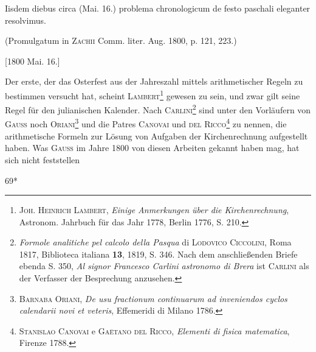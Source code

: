 \indent Iisdem diebus circa (Mai. 16.) problema chronologicum de festo paschali eleganter resolvimus.
\par\indent(Promulgatum in \textsc{Zachii} Comm. liter. Aug. 1800, p. 121, 223.)
\par\noindent\hfill[1800 Mai. 16.]

\medskip\begingroup\small
\renewcommand{\thefootnote}{*)}
\indent Der erste, der das Osterfest aus der Jahreszahl mittels arithmetischer Regeln zu bestimmen versucht hat, scheint \textsc{Lambert}\footnote{\textsc{Joh. Heinrich Lambert}, \textit{Einige Anmerkungen über die Kirchenrechnung}, Astronom. Jahrbuch für das Jahr 1778, Berlin 1776, S. 210.} gewesen zu sein, und zwar gilt seine Regel für den julianischen Kalender. Nach \textsc{Carlini}\renewcommand{\thefootnote}{**)}\footnote{\textit{Formole analitiche pel calcolo della Pasqua} di \textsc{Lodovico Ciccolini}, Roma 1817, Biblioteca italiana \textbf{13}, 1819, S. 346. Nach dem anschließenden Briefe ebenda S. 350, \textit{Al signor Francesco Carlini astronomo di Brera} ist \textsc{Carlini} als der Verfasser der Besprechung anzusehen.} sind unter den Vorläufern von \textsc{Gauss} noch \textsc{Oriani}\renewcommand{\thefootnote}{***)}\footnote{\textsc{Barnaba Oriani}, \textit{De usu fractionum continuarum ad inveniendos cyclos calendarii novi et veteris}, Effemeridi di Milano 1786.} und die Patres \textsc{Canovai} und \textsc{del Ricco}\renewcommand{\thefootnote}{\ensuremath{\dagger})}\footnote{\textsc{Stanislao Canovai} e \textsc{Gaëtano del Ricco}, \textit{Elementi di fisica matematica}, Firenze 1788.} zu nennen, die arithmetische Formeln zur Lösung von Aufgaben der Kirchenrechnung aufgestellt haben. Was \textsc{Gauss} im Jahre 1800 von diesen Arbeiten gekannt haben mag, hat sich nicht feststellen
\par\bigskip\noindent\hfill69*\hspace*{.14\linewidth}
\par\endgroup

